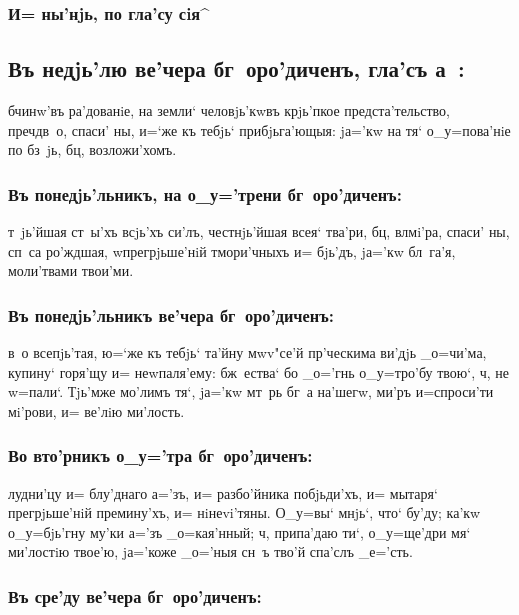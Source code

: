 \documentclass[14pt,twoside]{extreport}
\renewcommand{\*}{~~\raise3pt\hbox{\footnotesize*}}
\begin{document}
\subsubsection{И= ны'нjь, по гла'су сiя^}

\subsection[Гла'съ а~]{Въ недjь'лю ве'чера бг~оро'диченъ, гла'съ а~:}

б чинw'въ ра'дованiе, на земли` че\-ло\-вjь'\-кwвъ крjь'п\-кое
предста'тельство, преч дв~о, спа\-си' ны, и=`же къ тебjь` прибjьга'ющыя:
jа='кw на тя` о_у=пова'нiе по бз~jь, бц, возложи'хомъ.

\subsubsection{Въ понедjь'льникъ, на о_у='трени бг~оро'диченъ:}

т~jь'йшая ст~ы'хъ всjь'хъ си'лъ, честнjь'йшая всея` тва'ри, бц,
вл мi'ра, спаси' ны, сп~са ро'жд\-шая, w\т прегрjьше'нiй тмори'чныхъ и=
бjь'дъ, jа='кw бл~га'я, моли'твами твои'ми.

\subsubsection{Въ понедjь'льникъ ве'чера бг~оро'диченъ:}

в~о всепjь'тая, ю=`же къ тебjь` та'йну мwv"се'й пр'ческима ви'дjь
_о=чи'ма, купину` горя'щу и= не\-w\-па\-ля'\-е\-му: бж~ества` бо _о='гнь о_у=тро'бу
твою`, ч, не w=пали`. Тjь'мже мо'лимъ тя`, jа='кw мт~рь бг~а на'шегw,
ми'ръ и=спроси'ти мi'рови, и= ве'лiю ми'лость.

\subsubsection{Во вто'рникъ о_у='тра бг~оро'диченъ:}

лудни'цу и= блу'днаго а='зъ, и= разбо'йника побjьди'хъ, и= мытаря`
прегрjьше'нiй премину'хъ, и= нiнеvi'тяны. О_у=вы` мнjь`, что` бу'ду; ка'кw
о_у=бjь'гну му'ки а='зъ _о=кая'нный; ч, припа'даю ти`, о_у=ще'дри мя`
ми'лостiю твое'ю, jа='коже _о='ныя сн~ъ тво'й спа'слъ _е='сть.

\subsubsection{Въ сре'ду ве'чера бг~оро'диченъ:}
\end{document}
